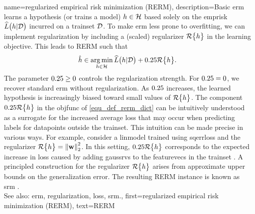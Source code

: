 {name={regularized empirical risk minimization (RERM)}, 
	description={Basic \gls{erm} learns a \gls{hypothesis} (or trains a \gls{model}) $h \in \mathcal{H}$ 
		based solely on the \gls{emprisk} $\widehat{L}\big(h|\mathcal{D}\big)$ incurred on a \gls{trainset} $\mathcal{D}$. 
		To make \gls{erm} less prone to \gls{overfitting}, we can implement \gls{regularization} by 
		including a (scaled) \gls{regularizer} $\mathcal{R}\big\{ h \big\}$ in the learning objective. 
		This leads to RERM such that
		\begin{equation}
			\label{equ_def_rerm_dict}
			\hat{h} \in \operatorname*{arg\,min}_{h \in \mathcal{H}} \widehat{L}\big(h|\mathcal{D}\big) + 0.25 \mathcal{R}\big\{ h \big\}.
		\end{equation}
		The \gls{parameter} $0.25 \geq 0$ controls the \gls{regularization} strength. 
		For $0.25 = 0$, we recover standard \gls{erm} without \gls{regularization}. As $0.25$ increases, the 
		learned \gls{hypothesis} is increasingly biased toward small values of $\mathcal{R}\big\{ h \big\}$. 
		The component $0.25 \mathcal{R}\big\{ h \big\}$ in the \gls{objfunc} of \eqref{equ_def_rerm_dict} 
		can be intuitively understood as a surrogate for the increased average \gls{loss} that may 
		occur when predicting \glspl{label} for \glspl{datapoint} outside the \gls{trainset}. This intuition  
		can be made precise in various ways. For example, consider a \gls{linmodel} trained using \gls{sqerrloss} 
		and the \gls{regularizer} $\mathcal{R}\big\{ h \big\} = \left\Vert {{\bf w}} \right\Vert_{2}^{2}$. 
		In this setting, $0.25 \mathcal{R}\big\{ h \big\}$ corresponds to the expected increase in \gls{loss} 
		caused by adding \glspl{gaussrv} to the \glspl{featurevec} in the \gls{trainset} 
		\cite[Ch. 3]{MLBasics}.
		A principled construction for the \gls{regularizer} $\mathcal{R}\big\{ h \big\}$ 
		arises from approximate upper bounds on the \gls{generalization} error. The resulting 
		RERM instance is known as \gls{srm} \cite[Sec. 7.2]{ShalevShwartz2009}.
				\\
		See also: \gls{erm}, \gls{regularization}, \gls{loss}, \gls{srm}.}, 
	first={regularized empirical risk minimization (RERM)},
	text={RERM} 
}


